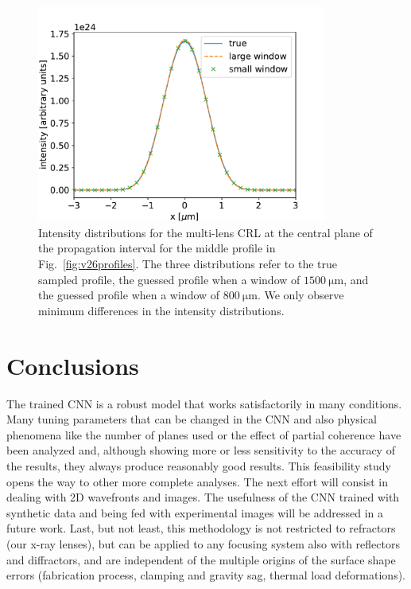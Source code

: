 \documentclass[preprint]{iucr}
\newcommand{\inred}[1]{{\color{red}#1}}
\begin{document}
\begin{figure}\label{fig:figure8}
\includegraphics[width=0.85\textwidth]{figures/figure8.pdf}

\caption{
Intensity distributions for the multi-lens CRL at the central plane of the propagation interval for the \inred{middle} profile in Fig.~\ref{fig:v26profiles}. The three distributions refer to the true sampled profile, the guessed profile when a window of $\SI{1500}{\micro\meter}$, and the guessed profile when a window of $\SI{800}{\micro\meter}$. We only observe  minimum differences in the intensity distributions.
    }
\end{figure}

\section{Conclusions}\label{sec:conclusions}

The trained CNN is a robust model that works satisfactorily in many conditions. Many tuning parameters that can be changed in the CNN and also physical phenomena like the number of planes used or the effect of partial coherence have been analyzed and, although showing more or less sensitivity to the accuracy of the results, they always produce reasonably good results. This feasibility study opens the way to other more complete analyses. The next effort will consist in dealing with 2D wavefronts and images.  
The usefulness of the CNN trained with synthetic data and being fed with  experimental images will be addressed in a future work.
\inred{Last, but not least, this methodology is not restricted to refractors (our x-ray lenses), but can be applied to any focusing system also with reflectors and diffractors, and are independent of the multiple origins of the surface shape errors (fabrication process, clamping and gravity sag, thermal load deformations). }
\end{document}
